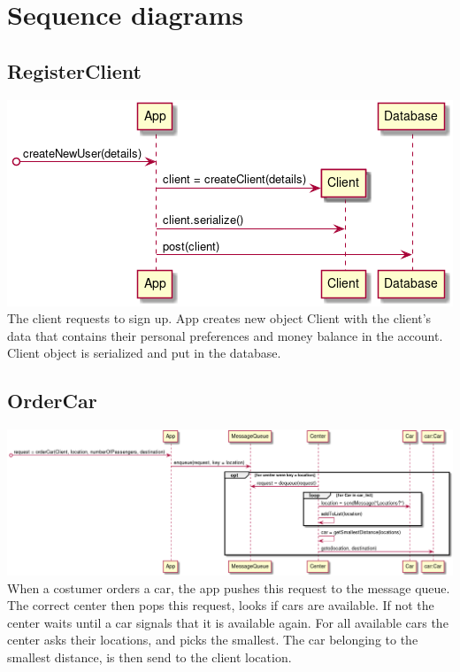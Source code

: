 \documentclass[a4paper]{article}
\begin{document}
\section*{Sequence diagrams}
\subsection*{RegisterClient}
\includegraphics[width=1\textwidth]{../Diagrams/registerClient.png}\\
The client requests to sign up. App creates new object Client with the client's data that contains their personal preferences and money balance in the account. Client object is serialized and put in the database. 
\subsection*{OrderCar}
\includegraphics[width=1\textwidth]{../Diagrams/orderCar.png}\\
When a costumer orders a car, the app pushes this request to the message queue.
The correct center then pops this request, looks if cars are available. If not the center waits until a car signals that it is available again. For all available cars the center asks their locations, and picks the smallest. The car belonging to the smallest distance, is then send to the client location.
\end{document}
